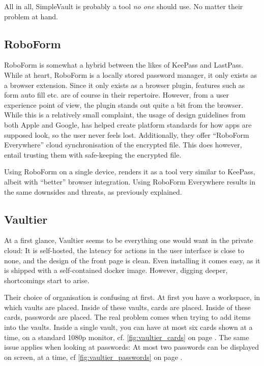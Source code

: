 			All in all, SimpleVault is probably a tool \emph{no one} should use. No matter their problem at hand.

		\subsection*{RoboForm}
			RoboForm\cite{roboform} is somewhat a hybrid between the likes of KeePass and LastPass. While at heart, RoboForm is a locally stored password manager, it only exists as a browser extension. Since it only exists as a browser plugin, features such as form auto fill etc. are of course in their repertoire. However, from a user experience point of view, the plugin stands out quite a bit from the browser. While this is a relatively small complaint, the usage of design guidelines from both Apple and Google, has helped create platform standards for how apps are supposed look, so the user never feels lost. Additionally, they offer ``RoboForm Everywhere'' cloud synchronisation of the encrypted file. This does however, entail trusting them with safe-keeping the encrypted file.

			Using RoboForm on a single device, renders it as a tool very similar to KeePass, albeit with ``better'' browser integration. Using RoboForm Everywhere results in the same downsides and threats, as previously explained.

		\subsection*{Vaultier}
			At a first glance, Vaultier\cite{vaultier} seems to be everything one would want in the private cloud: It is self-hosted, the latency for actions in the user interface is close to none, and the design of the front page is clean. Even installing it comes easy, as it is shipped with a self-contained docker image. However, digging deeper, shortcomings start to arise.

			Their choice of organisation is confusing at first. At first you have a workspace, in which vaults are placed. Inside of these vaults, cards are placed. Inside of these cards, passwords are placed. The real problem comes when trying to add items into the vaults. Inside a single vault, you can have at most six cards shown at a time, on a standard 1080p monitor, cf. \ref{fig:vaultier_cards} on page \pageref{fig:vaultier_cards}. The same issue applies when looking at passwords: At most two passwords can be displayed on screen, at a time, cf \ref{fig:vaultier_passwords} on page \pageref{fig:vaultier_passwords}.

